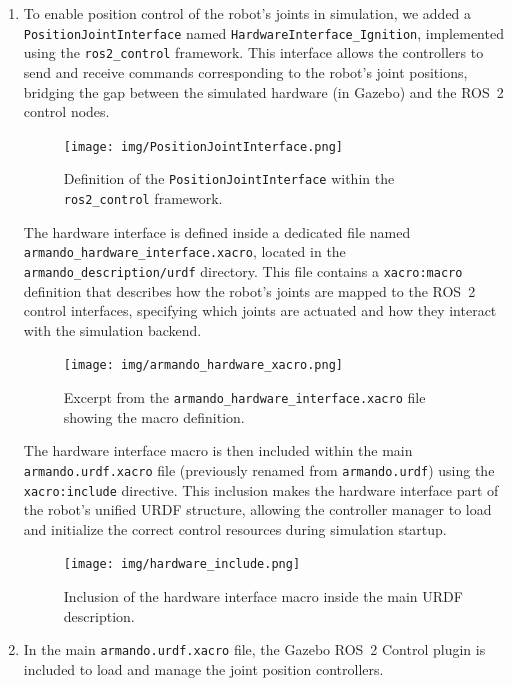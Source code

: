 \documentclass{article}
\begin{document}
\begin{enumerate}
\clearpage
\item To enable position control of the robot’s joints in simulation, we added a 
\lstinline{PositionJointInterface} named \lstinline{HardwareInterface_Ignition}, 
implemented using the \lstinline{ros2_control} framework. This interface allows the controllers to 
send and receive commands corresponding to the robot’s joint positions, bridging the gap between 
the simulated hardware (in Gazebo) and the ROS~2 control nodes.

\begin{figure}[H]
    \centering
    \texttt{[image: img/PositionJointInterface.png]}
    \caption{Definition of the \texttt{PositionJointInterface} within the \texttt{ros2\_control} framework.}
    \label{fig:PositionJointInterface}
\end{figure}

\noindent The hardware interface is defined inside a dedicated file named 
\lstinline{armando_hardware_interface.xacro}, located in the 
\lstinline{armando_description/urdf} directory. This file contains a 
\lstinline{xacro:macro} definition that describes how the robot’s joints are mapped to the 
ROS~2 control interfaces, specifying which joints are actuated and how they interact with the 
simulation backend.

\begin{figure}[H]
    \centering
    \texttt{[image: img/armando\_hardware\_xacro.png]}
    \caption{Excerpt from the \texttt{armando\_hardware\_interface.xacro} file showing the macro definition.}
    \label{fig:armando_hardware_xacro}
\end{figure}

\noindent The hardware interface macro is then included within the main 
\lstinline{armando.urdf.xacro} file (previously renamed from \lstinline{armando.urdf}) 
using the \lstinline{xacro:include} directive. This inclusion makes the hardware interface 
part of the robot’s unified URDF structure, allowing the controller manager to load and initialize 
the correct control resources during simulation startup.

\begin{figure}[H]
    \centering
    \texttt{[image: img/hardware\_include.png]}
    \caption{Inclusion of the hardware interface macro inside the main URDF description.}
    \label{fig:hardware_include}
\end{figure}


\item In the main \lstinline{armando.urdf.xacro} file, the Gazebo ROS~2 Control plugin is included to load and manage the joint position controllers.


\end{enumerate}
\end{document}
